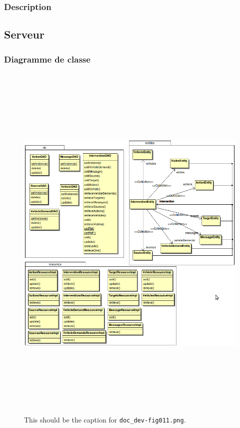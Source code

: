 \documentclass{article}
\begin{document}
\subsubsection{Description}

\subsection{Serveur}

\subsubsection{Diagramme de classe}

\begin{figure}[htbp]
\begin{center}
\includegraphics[width=526pt, height=509pt]{doc_dev-fig011.png}
\caption{This should be the caption for \texttt{doc\_dev-fig011.png}.}
\end{center}
\end{figure}
\end{document}
